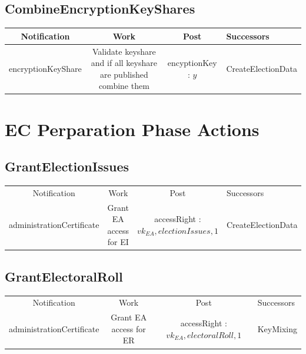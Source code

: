 \documentclass[bibtotoc,halfparskip,oneside]{scrreprt}
\begin{document}
\begin{landscape}
		\subsection{CombineEncryptionKeyShares}
		\begin{tabularx}{\linewidth}{|c|c|c|X|}
			\hline Notification & Work & Post & Successors\\  
			\hline  encryptionKeyShare & Validate keyshare and if all keyshare are published combine them & encyptionKey : $y$ & CreateElectionData \\ 
			\hline 
		\end{tabularx}
			
			
		
		\section{EC Perparation Phase Actions}
		
		\subsection{GrantElectionIssues}
		\begin{tabularx}{\linewidth}{|c|c|c|X|}
			\hline Notification & Work & Post & Successors\\
			administrationCertificate & Grant EA access for EI & accessRight : $vk_{EA}, electionIssues , 1 $ & CreateElectionData \\
			\hline 
		\end{tabularx}
		
		\subsection{GrantElectoralRoll}
			\begin{tabularx}{\linewidth}{|c|c|c|X|}
				\hline Notification & Work & Post & Successors\\
				administrationCertificate & Grant EA access for ER & accessRight : $vk_{EA}, electoralRoll , 1 $ & KeyMixing \\ 
				\hline 
			\end{tabularx}
		

\end{landscape}
\end{document}
